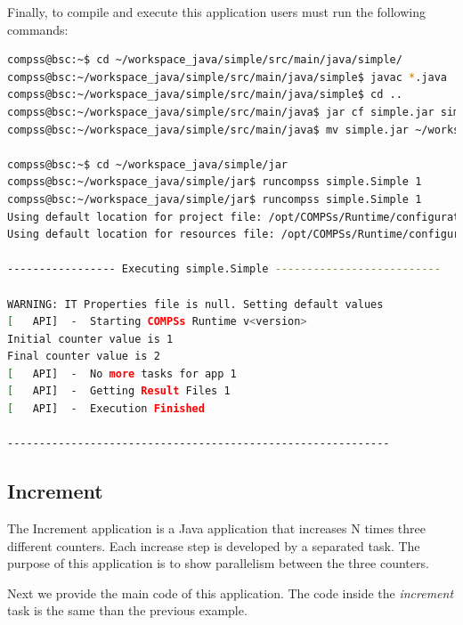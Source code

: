 Finally, to compile and execute this application users must run the following commands:

\begin{lstlisting}[language=bash]
compss@bsc:~$ cd ~/workspace_java/simple/src/main/java/simple/
compss@bsc:~/workspace_java/simple/src/main/java/simple$ javac *.java
compss@bsc:~/workspace_java/simple/src/main/java/simple$ cd ..
compss@bsc:~/workspace_java/simple/src/main/java$ jar cf simple.jar simple
compss@bsc:~/workspace_java/simple/src/main/java$ mv simple.jar ~/workspace_java/simple/jar/

compss@bsc:~$ cd ~/workspace_java/simple/jar
compss@bsc:~/workspace_java/simple/jar$ runcompss simple.Simple 1
compss@bsc:~/workspace_java/simple/jar$ runcompss simple.Simple 1
Using default location for project file: /opt/COMPSs/Runtime/configuration/xml/projects/project.xml
Using default location for resources file: /opt/COMPSs/Runtime/configuration/xml/resources/resources.xml

----------------- Executing simple.Simple --------------------------

WARNING: IT Properties file is null. Setting default values
[   API]  -  Starting COMPSs Runtime v<version>
Initial counter value is 1
Final counter value is 2
[   API]  -  No more tasks for app 1
[   API]  -  Getting Result Files 1
[   API]  -  Execution Finished

------------------------------------------------------------
\end{lstlisting}


\subsection{Increment}
The Increment application is a Java application that increases N times three different counters. Each increase step is developed by a separated task. The
purpose of this application is to show parallelism between the three counters.

Next we provide the main code of this application. The code inside the \textit{increment} task is the same than the previous example. 

